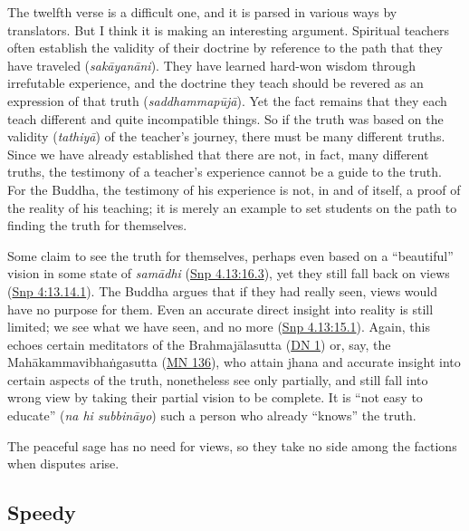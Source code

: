 \documentclass[12pt,openany]{book}%
\begin{document}
The twelfth verse is a difficult one, and it is parsed in various ways by translators. But I think it is making an interesting argument. Spiritual teachers often establish the validity of their doctrine by reference to the path that they have traveled (\textit{\textsanskrit{sakāyanāni}}). They have learned hard-won wisdom through irrefutable experience, and the doctrine they teach should be revered as an expression of that truth (\textit{\textsanskrit{saddhammapūjā}}). Yet the fact remains that they each teach different and quite incompatible things. So if the truth was based on the validity (\textit{\textsanskrit{tathiyā}}) of the teacher’s journey, there must be many different truths. Since we have already established that there are not, in fact, many different truths, the testimony of a teacher’s experience cannot be a guide to the truth. For the Buddha, the testimony of his experience is not, in and of itself, a proof of the reality of his teaching; it is merely an example to set students on the path to finding the truth for themselves.

Some claim to see the truth for themselves, perhaps even based on a “beautiful” vision in some state of \textit{\textsanskrit{samādhi}} (\href{https://suttacentral.net/snp4.13/en/sujato\#16.3}{Snp 4.13:16.3}), yet they still fall back on views (\href{https://suttacentral.net/snp4/en/sujato\#13.14.1}{Snp 4:13.14.1}). The Buddha argues that if they had really seen, views would have no purpose for them. Even an accurate direct insight into reality is still limited; we see what we have seen, and no more (\href{https://suttacentral.net/snp4.13/en/sujato\#15.1}{Snp 4.13:15.1}). Again, this echoes certain meditators of the \textsanskrit{Brahmajālasutta} (\href{https://suttacentral.net/dn1/en/sujato}{DN 1}) or, say, the \textsanskrit{Mahākammavibhaṅgasutta} (\href{https://suttacentral.net/mn136/en/sujato}{MN 136}), who attain jhana and accurate insight into certain aspects of the truth, nonetheless see only partially, and still fall into wrong view by taking their partial vision to be complete. It is “not easy to educate” (\textit{na hi \textsanskrit{subbināyo}}) such a person who already “knows” the truth.

The peaceful sage has no need for views, so they take no side among the factions when disputes arise.

\subsection*{Speedy}
\end{document}
